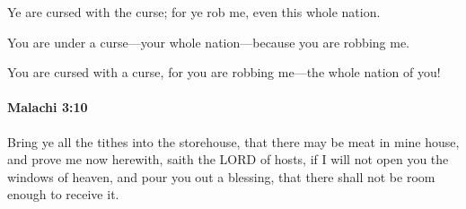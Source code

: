 			\begin{versebox}
					\item[BHS] 
					\item[LXX] 
					\item[ASV] Ye are cursed with the curse; for ye rob me, even this whole nation.
					\item[NIV] You are under a curse—your whole nation—because you are robbing me.
					\item[NRSV] You are cursed with a curse, for you are robbing me—the whole nation of you!
			\end{versebox}

		\paragraph{Malachi 3:10} %
			\label{MALACHI-3-10}

			Bring ye all the tithes into the storehouse, that there may be meat in mine house, and prove me now herewith, saith the LORD of hosts, if I will not open you the windows of heaven, and pour you out a blessing, that there shall not be room enough to receive it.

